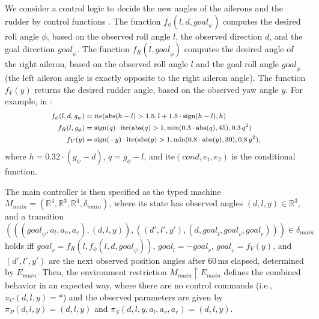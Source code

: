 \documentclass{sig-alternate}
\newcommand{\abs}{\ensuremath{\mathrm{abs}}}
\newcommand{\sign}{\ensuremath{\mathrm{sign}}}
\begin{document}
We consider a control logic to decide 
the new angles of the ailerons and the rudder
by control functions \cite{ftscs-journal}.
%
The function $f_\phi(l, d, \mathit{goal}_\psi)$
computes the desired roll angle $\phi$,
 based on 
the observed roll angle $l$, the observed direction $d$, and 
the goal direction $\mathit{goal}_\psi$.
%
The function
 $f_{R}(l, \mathit{goal}_\phi)$
computes the desired angle of the right aileron,
based on the observed roll angle $l$ and the goal roll angle $\mathit{goal}_\phi$
(the left aileron angle is %
exactly opposite to the right aileron angle).
%
The function $f_V(y)$ returns the desired rudder angle,
based on the observed yaw angle $y$. %
For example,
in \cite{ftscs-journal}:
\[
\begin{medsize}
\begin{aligned}
f_\phi(l, d, \mathit{g}_\psi) &= 
\mathrm{ite}(\abs(h - l) > 1.5, l +  1.5 \cdot\sign(h-l), h)
\\
f_{R}(l, \mathit{g}_\phi) &=
\sign(q)\cdot \mathrm{ite}(\abs(q) > 1, \min(0.3 \cdot \abs(q), 45), 0.3 \, q^2)
\\
f_V(y) &=
\begin{aligned}[t]
\sign(-y)\cdot \mathrm{ite}(\abs(y) > 1, \min(0.8 \cdot \abs(y), 30), 0.8 \, y^2),
\end{aligned}
\end{aligned}
\end{medsize}
\]
where $h = 0.32 \cdot (\mathit{g}_\psi - d)$,
$q = \mathit{g}_\phi - l$,
and $\mathrm{ite}(\mathit{cond},e_1,e_2)$ is the conditional function.


The main controller is then specified 
as the typed machine $M_\mathit{main} = (\mathbb{R}^4, \mathbb{R}^3, \mathbb{R}^4, \delta_\mathit{main})$,
where
its state has observed %
 angles $(d, l, y) \in \mathbb{R}^3$,
and a transition
$(((\mathit{goal}_\psi, a_l, a_v, a_r), \allowbreak (d,l,y)), \allowbreak
((d', l', y'), \allowbreak (d, \mathit{goal}_l, \mathit{goal}_v, \mathit{goal}_r))) \in \delta_\mathit{main}$
holds iff 
$\mathit{goal}_r = f_{R}(l, f_\phi(l, d, \mathit{goal}_\psi))$,
$\mathit{goal}_l = - \mathit{goal}_r$,  
$\mathit{goal}_v = f_V(y)$,
and
$(d', l', y')$ are the next observed position angles 
after $60\,\mathrm{ms}$ elapsed,
determined by $E_\mathit{main}$.
Then, the environment restriction $M_\mathit{main} \restriction E_\mathit{main}$
 defines the combined behavior in an expected way,
where there are no control commands (i.e., $\pi_C(d,l,y) = \ast$)
and
the observed parameters 
are given by
$\pi_P(d,l,y) = (d,l,y)$ and $\pi_S(d,  l, y, a_l, a_v, a_r) = (d,l,y)$.
\end{document}
